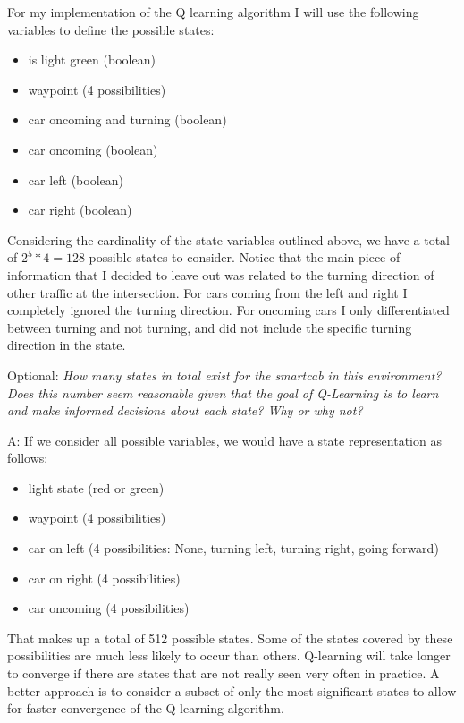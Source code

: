 \documentclass[conference]{IEEEtran}
\begin{document}
For my implementation of the Q learning algorithm I will use the
following variables to define the possible states:

\begin{itemize}
\item is light green (boolean)
\item waypoint (4 possibilities)
\item car oncoming and turning (boolean)
\item car oncoming (boolean)
\item car left (boolean)
\item car right (boolean)
\end{itemize}

Considering the cardinality of the state variables outlined above, we have a
total of $2^{5} * 4 = 128$ possible states to consider.  Notice that the main
piece of information that I decided to leave out was related to the turning
direction of other traffic at the intersection.  For cars coming from the left
and right I completely ignored the turning direction. For oncoming cars I
only differentiated between turning and not turning, and did not include the
specific turning direction in the state.

\vspace{1em}
\noindent Optional: \textit{How many states in total exist for the smartcab in
this environment? Does this number seem reasonable given that the goal of
Q-Learning is to learn and make informed decisions about each state? Why or why
not?}


\vspace{2em} \noindent A: If we consider all possible variables, we would have
a state representation as follows:

\begin{itemize}
\item light state (red or green)
\item waypoint (4 possibilities)
\item car on left (4 possibilities: None, turning left, turning right, going forward)
\item car on right (4 possibilities)
\item car oncoming (4 possibilities)
\end{itemize}

That makes up a total of 512 possible states.  Some of the states covered by
these possibilities are much less likely to occur than others.  Q-learning 
will take longer to converge if there are states that are not really seen very
often in practice.  A better approach is to consider a subset of only the most
significant states to allow for faster convergence of the Q-learning algorithm.
\end{document}
